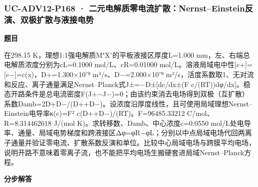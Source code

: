 \documentclass[UTF8,11pt,a4paper]{ctexart}
\begin{document}
\subsubsection*{UC-ADV12-P168 · 二元电解质零电流扩散：Nernst–Einstein反演、双极扩散与液接电势}
\noindent\textbf{题目}\par
在298.15 K，理想1:1强电解质M⁺X⁻的平板液接区厚度L=1.000 mm，左、右端总电解质浓度分别为cL=0.1000 mol/L、cR=0.01000 mol/L。溶液局域电中性[c+]=[c−]=c(x)，D+=1.300×10⁻⁹ m²/s、D−=2.000×10⁻⁹ m²/s，活度系数取1、无对流和反应、离子通量满足Nernst–Planck式J±=−D±[dc/dx±(F c/(RT))dφ/dx]。稳态开路条件是总电流密度F(J+−J−)=0；由该约束消去电场得到双极（互扩散）系数Damb=2D+D−/(D++D−)。设浓度沿厚度线性，且可使用局域理想Nernst–Einstein电导率κ(c)=F² c(D++D−)/(RT)。F=96485.33212 C/mol、R=8.314462618 J/(mol K)。求转移数、Damb、中心浓度c=0.0550 mol/L处电导率、通量、局域电势梯度和跨液接区Δφ=φR−φL；分别以中点局域电场代回两离子通量并验证零电流、扩散系数反演和单位。比较中心局域电场与跨膜平均电场，说明开路不意味着零离子流，也不能把平均电场生搬硬套进局域Nernst–Planck方程。\par
\medskip\noindent\textbf{分步解答}
\end{document}

